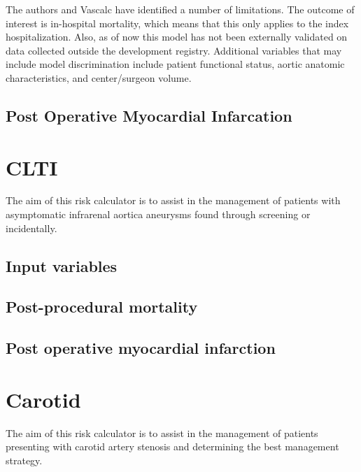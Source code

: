 \documentclass[
]{book}
\begin{document}
The authors and Vascalc have identified a number of limitations. The outcome of interest is in-hospital mortality, which means that this only applies to the index hospitalization. Also, as of now this model has not been externally validated on data collected outside the development registry. Additional variables that may include model discrimination include patient functional status, aortic anatomic characteristics, and center/surgeon volume.

\hypertarget{post-operative-myocardial-infarcation}{%
\section{Post Operative Myocardial Infarcation}\label{post-operative-myocardial-infarcation}}

\hypertarget{clti}{%
\chapter{CLTI}\label{clti}}

The aim of this risk calculator is to assist in the management of patients with asymptomatic infrarenal aortica aneurysms found through screening or incidentally.

\hypertarget{input-variables-1}{%
\section{Input variables}\label{input-variables-1}}

\hypertarget{post-procedural-mortality}{%
\section{Post-procedural mortality}\label{post-procedural-mortality}}

\hypertarget{post-operative-myocardial-infarction}{%
\section{Post operative myocardial infarction}\label{post-operative-myocardial-infarction}}

\hypertarget{carotid}{%
\chapter{Carotid}\label{carotid}}

The aim of this risk calculator is to assist in the management of patients presenting with carotid artery stenosis and determining the best management strategy.
\end{document}
